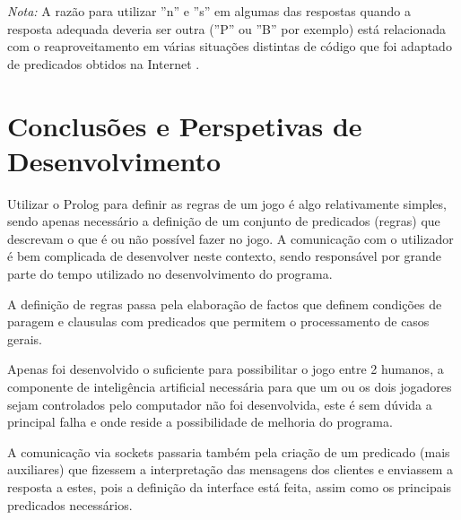 \documentclass[15pt,a4paper]{article}
\begin{document}
\emph{Nota:} A razão para utilizar ''n'' e ''s'' em algumas das respostas quando a resposta adequada deveria ser outra (''P'' ou ''B'' por exemplo) está relacionada com o reaproveitamento em várias situações distintas de código que foi adaptado de predicados obtidos na Internet \cite{developerzen}.


\section{Conclusões e Perspetivas de Desenvolvimento}
Utilizar o Prolog para definir as regras de um jogo é algo relativamente simples, sendo apenas necessário a definição de um conjunto de predicados (regras) que descrevam o que é ou não possível fazer no jogo. A comunicação com o utilizador é bem complicada de desenvolver neste contexto, sendo responsável por grande parte do tempo utilizado no desenvolvimento do programa.


A definição de regras passa pela elaboração de factos que definem condições de paragem e clausulas com predicados que permitem o processamento de casos gerais.


Apenas foi desenvolvido o suficiente para possibilitar o jogo entre 2 humanos, a componente de inteligência artificial necessária para que um ou os dois jogadores sejam controlados pelo computador não foi desenvolvida, este é sem dúvida a principal falha e onde reside a possibilidade de melhoria do programa.


A comunicação via sockets passaria também pela criação de um predicado (mais auxiliares) que fizessem a interpretação das mensagens dos clientes e enviassem a resposta a estes, pois a definição da interface está feita, assim como os principais predicados necessários.


\clearpage
{}
\renewcommand\refname{Bibliografia}



\listoffigures

\newpage
\appendix
\end{document}
